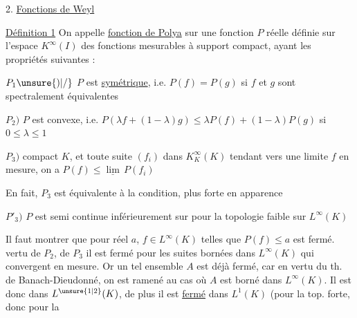 2. \uline{Fonctions de Weyl}

 \uline{Définition 1}   On appelle \uline{fonction de Polya} sur  \inserted{$I=]0,\omega[$ $(0<\omega\leq+\infty)$} une fonction $P$ réelle définie sur l'espace $K^\infty(I)$ des fonctions mesurables à support compact, ayant les propriétés suivantes :

$P_1\unsure{)|/}$ $P$ est \uline{symétrique}, i.e. $P(f)=P(g)$ si $f$ et $g$ sont spectralement équivalentes

$P_2)$ $P$ est convexe, i.e. $P(\lambda f+(1-\lambda)g)\leq\lambda P(f)+(1-\lambda)P(g)$ si $0\leq\lambda\leq1$

$P_3)$   compact $K$,  et toute suite $(f_i)$ dans $K^\infty_K(K)$ tendant vers une  limite $f$ en mesure, on a $P(f)\leq\underline{\lim}\,P(f_i)$

En fait, $P_3$ est équivalente à la condition, plus forte en apparence

$P'_3)$  $P$ est semi continue inférieurement sur  pour la topologie faible sur $L^\infty(K)$

Il faut montrer que pour  réel $a$, \deleted{$P^{-1}([\unsure{a|-\infty},\unsure{-\infty|a}[)$}   $f\in L^\infty(K)$ telles que $P(f)\leq a$ est  fermé.      vertu de $P_2$,   de $P_3$ il est fermé pour les suites bornées dans $L^\infty(K)$ qui convergent en mesure. Or un tel ensemble $A$ est déjà  fermé, car en vertu du th. de Banach-Dieudonné, on est ramené au cas où $A$ est borné dans $L^\infty(K)$. Il est donc    dans $L^{\unsure{1|2}}(K)$,  de plus il est \uline{fermé} dans $L^1(K)$ (pour la top. forte, donc pour la

